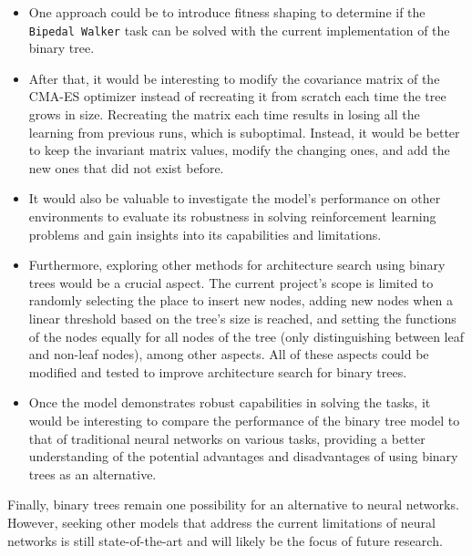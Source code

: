 \begin{itemize}

\item One approach could be to introduce fitness shaping to determine if the \texttt{Bipedal Walker} task can be solved with the current implementation of the binary tree.

\item After that, it would be interesting to modify the covariance matrix of the CMA-ES optimizer instead of recreating it from scratch each time the tree grows in size. Recreating the matrix each time results in losing all the learning from previous runs, which is suboptimal. Instead, it would be better to keep the invariant matrix values, modify the changing ones, and add the new ones that did not exist before.

\item It would also be valuable to investigate the model's performance on other environments to evaluate its robustness in solving reinforcement learning problems and gain insights into its capabilities and limitations.

\item Furthermore, exploring other methods for architecture search using binary trees would be a crucial aspect. The current project's scope is limited to randomly selecting the place to insert new nodes, adding new nodes when a linear threshold based on the tree's size is reached, and setting the functions of the nodes equally for all nodes of the tree (only distinguishing between leaf and non-leaf nodes), among other aspects. All of these aspects could be modified and tested to improve architecture search for binary trees.

\item Once the model demonstrates robust capabilities in solving the tasks, it would be interesting to compare the performance of the binary tree model to that of traditional neural networks on various tasks, providing a better understanding of the potential advantages and disadvantages of using binary trees as an alternative.

\end{itemize}

Finally, binary trees remain one possibility for an alternative to neural networks. However, seeking other models that address the current limitations of neural networks is still state-of-the-art and will likely be the focus of future research.
